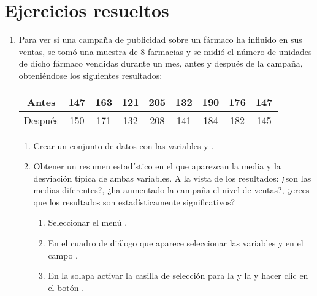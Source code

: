 \section{Ejercicios resueltos}
\begin{enumerate}[leftmargin=*] 
\item  Para ver si una campaña de publicidad sobre un fármaco ha influido en sus ventas, se tomó una muestra de 8 farmacias y se midió el
número de unidades de dicho fármaco vendidas durante un mes, antes y después de la campaña, obteniéndose los siguientes resultados: 
\begin{center}
\begin{tabular}{|c||c|c|c|c|c|c|c|c|}
\hline 
Antes & 147 & 163 & 121 & 205 & 132 & 190 & 176 & 147 \\
\hline 
Después & 150 & 171 & 132 & 208 & 141 & 184 & 182 & 145\\ 
\hline
\end{tabular}
\end{center}

\begin{enumerate}
\item Crear un conjunto de datos con las variables  y .

\item Obtener un resumen estadístico en el que aparezcan la media y la desviación típica de ambas variables. A la vista
de los resultados: ¿son las medias diferentes?, ¿ha aumentado la campaña el nivel de ventas?, ¿crees que los resultados
son estadísticamente significativos? 
\begin{indicacion}{
\begin{enumerate}
\item Seleccionar el menú .
\item En el cuadro de diálogo que aparece seleccionar las variables  y  en el campo
.
\item En la solapa  activar la casilla de selección para la  y la
 y hacer clic en el botón .
\end{enumerate}
}
\end{indicacion}


\end{enumerate}
\end{enumerate}
